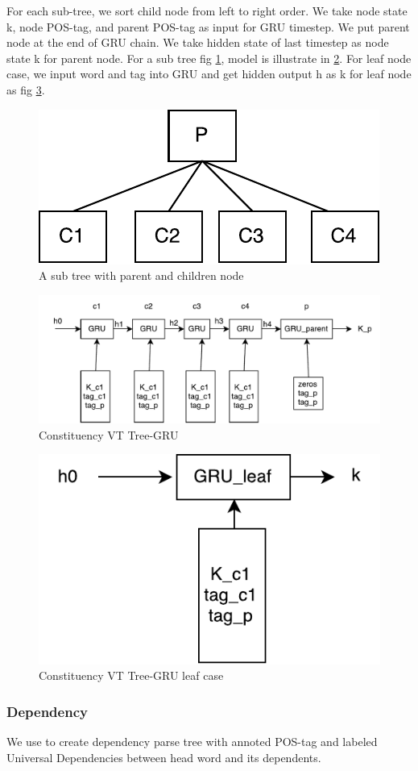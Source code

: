For each sub-tree, we sort child node from left to right order. We take node state k, node POS-tag, and parent POS-tag as input for GRU timestep. We put parent node at the end of GRU chain. We take hidden state of last timestep as node state k for parent node. For a sub tree fig \ref{fig:treecp}, model is illustrate in \ref{fig:cvtgru}. For leaf node case, we input word and tag into GRU and get hidden output h as k for leaf node as fig \ref{fig:gruleaf}.
\begin{figure}[H]
	\centering
	\includegraphics[width=0.5\linewidth]{figure/treecp}
	\caption[A sub tree with parent and children node]{A sub tree with parent and children node}
	\label{fig:treecp}
\end{figure}

\begin{figure}[H]
	\centering
	\includegraphics[width=0.7\linewidth]{figure/cvtgru}
	\caption[Constituency VT Tree-GRU]{Constituency VT Tree-GRU}
	\label{fig:cvtgru}
\end{figure}

\begin{figure}[H]
	\centering
	\includegraphics[width=0.4\linewidth]{figure/gruleaf}
	\caption[Constituency VT Tree-GRU leaf case]{Constituency VT Tree-GRU leaf case}
	\label{fig:gruleaf}
\end{figure}



\subsubsection{Dependency}
We use \cite{manning2014stanford} to create dependency parse tree with annoted POS-tag and labeled Universal Dependencies between head word and its dependents.

